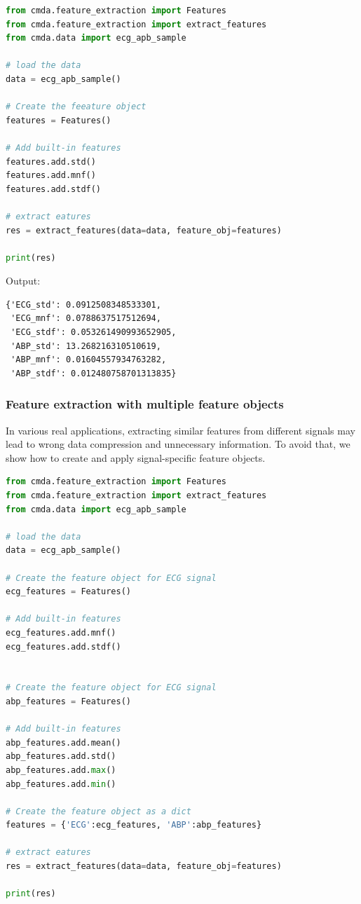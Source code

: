 \documentclass{article}
\begin{document}
\begin{lstlisting}[language=Python, caption=Multivariate feature extraction using one feature object]
from cmda.feature_extraction import Features
from cmda.feature_extraction import extract_features
from cmda.data import ecg_apb_sample

# load the data
data = ecg_apb_sample()

# Create the feeature object
features = Features()

# Add built-in features
features.add.std()
features.add.mnf()
features.add.stdf()

# extract eatures
res = extract_features(data=data, feature_obj=features)

print(res)
\end{lstlisting}

Output:
\begin{lstlisting}
{'ECG_std': 0.0912508348533301,
 'ECG_mnf': 0.0788637517512694,
 'ECG_stdf': 0.053261490993652905,
 'ABP_std': 13.268216310510619,
 'ABP_mnf': 0.01604557934763282,
 'ABP_stdf': 0.012480758701313835}
\end{lstlisting}

\subsubsection{Feature extraction with multiple feature objects}
In various real applications, extracting similar features from different signals may lead to wrong data compression and unnecessary information. To avoid that, we show how to create and apply signal-specific feature objects.

\begin{lstlisting}[language=Python, caption=Multivariate feature extraction using one feature object]
from cmda.feature_extraction import Features
from cmda.feature_extraction import extract_features
from cmda.data import ecg_apb_sample

# load the data
data = ecg_apb_sample()

# Create the feature object for ECG signal
ecg_features = Features()

# Add built-in features
ecg_features.add.mnf()
ecg_features.add.stdf()


# Create the feature object for ECG signal
abp_features = Features()

# Add built-in features
abp_features.add.mean()
abp_features.add.std()
abp_features.add.max()
abp_features.add.min()

# Create the feature object as a dict
features = {'ECG':ecg_features, 'ABP':abp_features}

# extract eatures
res = extract_features(data=data, feature_obj=features)

print(res)
\end{lstlisting}
\end{document}
